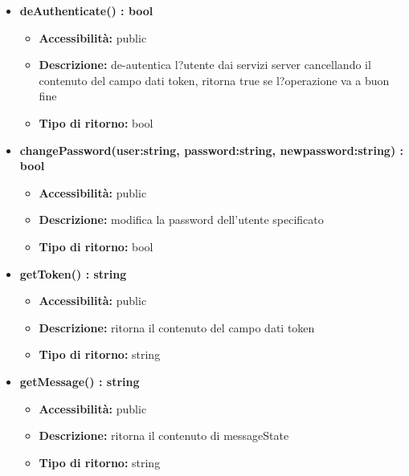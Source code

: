 {\begin{itemize}
		\item \textbf{deAuthenticate() : bool}
			\begin{itemize}
			\item \textbf{Accessibilit\`{a}:} public
			\item \textbf{Descrizione:} de-autentica l?utente dai servizi server cancellando il contenuto del campo dati token, ritorna true se l?operazione va a buon fine
			\item \textbf{Tipo di ritorno:} bool
			\end{itemize}
			
		\item \textbf{changePassword(user:string, password:string, newpassword:string) : bool}
			\begin{itemize}
			\item \textbf{Accessibilit\`{a}:} public
			\item \textbf{Descrizione:} modifica la password dell'utente specificato
			\item \textbf{Tipo di ritorno:} bool
			\end{itemize}
			
		\item \textbf{getToken() : string}
			\begin{itemize}
			\item \textbf{Accessibilit\`{a}:} public
			\item \textbf{Descrizione:} ritorna il contenuto del campo dati token
			\item \textbf{Tipo di ritorno:} string
			\end{itemize}
			
		\item \textbf{getMessage() : string}
			\begin{itemize}
			\item \textbf{Accessibilit\`{a}:} public
			\item \textbf{Descrizione:} ritorna il contenuto di messageState
			\item \textbf{Tipo di ritorno:} string
			\end{itemize}

		\end{itemize}
	}
	
	
	
	
	
	
	
	
	
	
